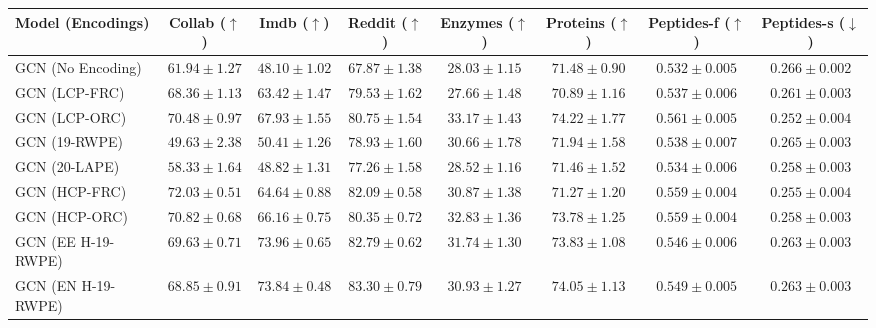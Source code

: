 \begin{table*}[t!]
\centering
\tiny
\begin{tabular}{|l|c|c|c|c|c|c|c|}
\hline
\textbf{Model (Encodings)} & \textbf{Collab} ($\uparrow$) & \textbf{Imdb} ($\uparrow$) & \textbf{Reddit} ($\uparrow$) & \textbf{Enzymes} ($\uparrow$) & \textbf{Proteins } ($\uparrow$) & \textbf{Peptides-f} ($\uparrow$) & \textbf{Peptides-s ($\downarrow$)} \\
\hline
GCN (No Encoding)         & $61.94 \pm 1.27$ & $48.10 \pm 1.02$ & $67.87 \pm 1.38$ & $28.03 \pm 1.15$ & $71.48 \pm 0.90$ & $0.532 \pm 0.005$ & $0.266 \pm 0.002$\\ \hline
GCN (LCP-FRC)    & $68.36 \pm 1.13$ & $63.42 \pm 1.47$ & $79.53 \pm 1.62$ & $27.66 \pm 1.48$ & $70.89 \pm 1.16$ & $0.537 \pm 0.006$ & $0.261 \pm 0.003$ \\
GCN (LCP-ORC)    & $70.48 \pm 0.97$ & $67.93 \pm 1.55$ & $80.75 \pm 1.54$ & $\mathbf{33.17 \pm 1.43}$ & $\mathbf{74.22 \pm 1.77}$ & $\mathbf{0.561 \pm 0.005}$ & $\mathbf{0.252 \pm 0.004}$ \\
GCN (19-RWPE)       & $49.63 \pm 2.38$ & $50.41 \pm 1.26$ & $78.93 \pm 1.60$ & $30.66 \pm 1.78$ & $71.94 \pm 1.58$ & $0.538 \pm 0.007$ & $0.265 \pm 0.003$ \\
GCN (20-LAPE)       & $58.33 \pm 1.64$ & $48.82 \pm 1.31$ & $77.26 \pm 1.58$ & $28.52 \pm 1.16$ & $71.46 \pm 1.52$ & $0.534 \pm 0.006$ & $0.258 \pm 0.003$\\
\hline
GCN (HCP-FRC) & $\mathbf{72.03 \pm 0.51}$ & $64.64 \pm 0.88$ & $82.09 \pm 0.58$ & $30.87 \pm 1.38$ & $71.27 \pm 1.20$ & $0.559 \pm 0.004$ & $0.255 \pm 0.004$ \\ 
GCN (HCP-ORC) & $70.82 \pm 0.68$ & $66.16 \pm 0.75$ & $80.35 \pm 0.72$ & $32.83 \pm 1.36$ & $73.78 \pm 1.25$ & $0.559 \pm 0.004$ & $0.258 \pm 0.003$ \\
GCN (EE H-19-RWPE) & $69.63 \pm 0.71$ & $\mathbf{73.96 \pm 0.65}$ & $82.79 \pm 0.62$ & $31.74 \pm 1.30$ & $73.83 \pm 1.08$ & $0.546 \pm 0.006$ & $0.263 \pm 0.003$ \\ 
GCN (EN H-19-RWPE) & $68.85 \pm 0.91$ & $73.84 \pm 0.48$ & $\mathbf{83.30 \pm 0.79}$ & $30.93 \pm 1.27$ & $74.05 \pm 1.13$ & $0.549 \pm 0.005$ & $0.263 \pm 0.003$ \\ 

\end{tabular}
\end{table*}
